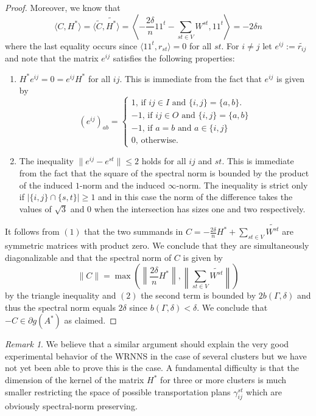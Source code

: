 \documentclass[12pt]{amsart}
\theoremstyle{remark}
\newtheorem{remark}[lemma]{Remark}
\begin{document}
\begin{proof}
Moreover, we know that
\[\langle C, H^*\rangle = \langle \widetilde{C}, \widetilde{H^*}\rangle = \left\langle -\frac{2\delta}{n}11^t-\sum_{st\in V} W^{st}, 11^t\right\rangle = -2\delta n\] 
where the last equality occurs since $\langle 11^t, r_{st}\rangle =0$ for all $st$. For $i\neq j$ let $e^{ij}:=\widetilde{r_{ij}}$ and note that the matrix $e^{ij}$ satisfies the following  properties:
\begin{enumerate}
\item  $H^*e^{ij}=0=e^{ij}H^*$ for all $ij$. This is immediate from the fact that $e^{ij}$ is given by
\[
(e^{ij})_{ab}=\begin{cases}
1 \text{, if $ij\in I$ and $\{i,j\}=\{a,b\}$} . \\
-1 \text{, if $ij\in O$ and $\{i,j\}=\{a,b\}$} \\
-1 \text{, if $a=b$ and $a\in \{i,j\}$}\\
0 \text{, otherwise}. 
\end{cases}
\]
 
\item The inequality $\|e^{ij}-e^{st}\|\leq 2$ holds for all $ij$ and $st$. This is immediate from the fact that the square of the spectral norm is bounded by the product of the induced $1$-norm and the induced $\infty$-norm. The inequality is strict only if $|\{i,j\}\cap\{s,t\}|\geq 1$ and in this case the norm of the difference takes the values of $\sqrt{3}$ and $0$ when the intersection has sizes one and two respectively.   
\end{enumerate}
It follows from $(1)$ that the two summands in $C=-\frac{2\delta}{n}H^* +\sum_{st\in V} \widetilde{W^{st}}$ are symmetric matrices with product zero. We conclude that they are simultaneously diagonalizable and that the spectral norm of $C$ is given by
\[\|C\|=\max\left(\left\|\frac{2\delta}{n}H^*\right\|, \left\|\sum_{st\in V} \widetilde{W^{st}}\right\|\right)\]
by the triangle inequality and $(2)$ the second term is bounded by $2b(\Gamma,\delta)$ and thus the spectral norm equals $2\delta$ since $b(\Gamma,\delta)<\delta$. We conclude that $-C\in \partial g(A^*)$ as claimed.
\end{proof}

\begin{remark} We believe that a similar argument should explain the very good experimental behavior of the WRNNS in the case of several clusters but we have not yet been able to prove this is the case. A fundamental difficulty is that the dimension of the kernel of the matrix $H^*$ for three or more clusters is much smaller restricting the space of possible transportation plans $\gamma_{ij}^{st}$ which are obviously spectral-norm preserving.
\end{remark}
\end{document}
